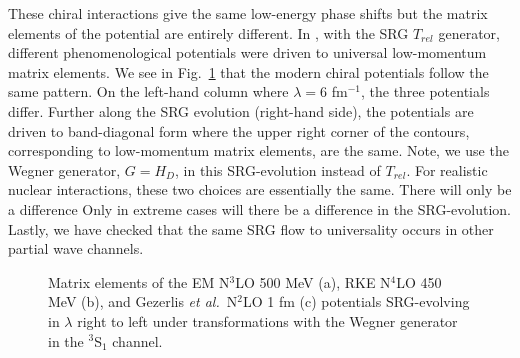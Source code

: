 \documentclass[preprintnumbers,floatfix,aps,prc,preprint,nofootinbib]{revtex4-1}
\begin{document}
These chiral interactions give the same low-energy phase shifts but the matrix elements of the potential are entirely different. In \cite{Dainton:2013axa}, with the SRG $T_{rel}$ generator, different phenomenological potentials were driven to universal low-momentum matrix elements. We see in Fig.~\ref{fig:potential_contours_3S1_Wegner} that the modern chiral potentials follow the same pattern. On the left-hand column where $\lambda=6$ fm$^{-1}$, the three potentials differ. Further along the SRG evolution (right-hand side), the potentials are driven to band-diagonal form where the upper right corner of the contours, corresponding to low-momentum matrix elements, are the same. Note, we use the Wegner generator, $G=H_D$, in this SRG-evolution instead of $T_{rel}$. For realistic nuclear interactions, these two choices are essentially the same. There will only be a difference Only in extreme cases will there be a difference in the SRG-evolution. Lastly, we have checked that the same SRG flow to universality occurs in other partial wave channels.
%
\begin{figure}[H]
	\centering
	

	\caption{Matrix elements of the EM N$^3$LO 500 MeV (a), RKE N$^4$LO 450 MeV (b), and Gezerlis \textit{et al.}~N$^2$LO 1 fm (c) potentials SRG-evolving in $\lambda$ right to left under transformations with the Wegner generator in the $^3$S$_1$ channel.}
	\label{fig:potential_contours_3S1_Wegner}
\end{figure}
\end{document}
